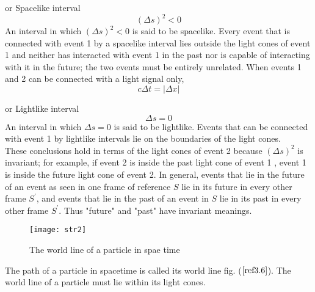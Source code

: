 \hspace{ 5cm}  or Spacelike interval
$$(\Delta s)^{2}<0$$
An interval in which $(\Delta s)^{2}<0$ is said to be spacelike. Every event that is connected with event 1 by a spacelike interval lies outside the light cones of event 1 and neither has interacted with event 1 in the past nor is capable of interacting with it in the future; the two events must be entirely unrelated.
When events 1 and 2 can be connected with a light signal only,
$$
c \Delta t=|\Delta x|
$$

\hspace{ 5cm} or Lightlike interval
$$
\Delta s=0
$$
An interval in which $\Delta s=0$ is said to be lightlike. Events that can be connected with event 1 by lightlike intervals lie on the boundaries of the light cones.\\
These conclusions hold in terms of the light cones of event 2 because $(\Delta s)^{2}$ is invariant; for example, if event 2 is inside the past light cone of event 1 , event 1 is inside the future light cone of event 2. In general, events that lie in the future of an event as seen in one frame of reference $S$ lie in its future in every other frame $S^{\prime}$, and events that lie in the past of an event in $S$ lie in its past in every other frame $S^{\prime}$. Thus "future" and "past" have invariant meanings.
\begin{figure}[H]
	\centering
	\texttt{[image: str2]}
	\caption{The world line of a particle in spae time}
	\label{ref3.6}
\end{figure}
The path of a particle in spacetime is called its world line fig. ($\ref{ref3.6}$). The world line of a particle must lie within its light cones.












